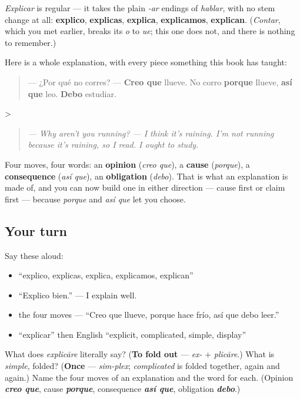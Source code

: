 \begin{grammarlens}[title={Grammar Lens: the shape of an explanation}]
\emph{Explicar} is regular — it takes the plain \emph{-ar} endings of \emph{hablar}, with no stem change at all: \textbf{explico}, \textbf{explicas}, \textbf{explica}, \textbf{explicamos}, \textbf{explican}. (\emph{Contar}, which you met earlier, breaks its \emph{o} to \emph{ue}; this one does not, and there is nothing to remember.)

Here is a whole explanation, with every piece something this book has taught:

\begin{quote}
— ¿Por qué no corres? — \textbf{Creo que} llueve. No corro \textbf{porque} llueve, \textbf{así que} leo. \textbf{Debo} estudiar.
\end{quote}

>

\begin{quote}
\emph{— Why aren't you running?} \emph{— I think it's raining. I'm not running because it's raining, so I read. I ought to study.}
\end{quote}

Four moves, four words: an \textbf{opinion} (\emph{creo que}), a \textbf{cause} (\emph{porque}), a \textbf{consequence} (\emph{así que}), an \textbf{obligation} (\emph{debo}). That is what an explanation is made of, and you can now build one in either direction — cause first or claim first — because \emph{porque} and \emph{así que} let you choose.
\end{grammarlens}

\subsection*{Your turn}
Say these aloud:

\begin{itemize}
\raggedright
  \item \textquotedblleft{}explico, explicas, explica, explicamos, explican\textquotedblright{}
  \item \textquotedblleft{}Explico bien.\textquotedblright{} — I explain well.
  \item the four moves — \textquotedblleft{}Creo que llueve, porque hace frío, así que debo leer.\textquotedblright{}
  \item \textquotedblleft{}explicar\textquotedblright{} then English \textquotedblleft{}explicit, complicated, simple, display\textquotedblright{}
\end{itemize}

\begin{tcolorbox}[breakable,colback=teal!4,colframe=teal!35!black,title={Before you move on}]
What does \emph{explicāre} literally say? (\textbf{To fold out} — \emph{ex-} + \emph{plicāre}.) What is \emph{simple}, folded? (\textbf{Once} — \emph{sim-plex}; \emph{complicated} is folded together, again and again.) Name the four moves of an explanation and the word for each. (Opinion \emph{\textbf{creo que}}, cause \emph{\textbf{porque}}, consequence \emph{\textbf{así que}}, obligation \emph{\textbf{debo}}.)
\end{tcolorbox}
